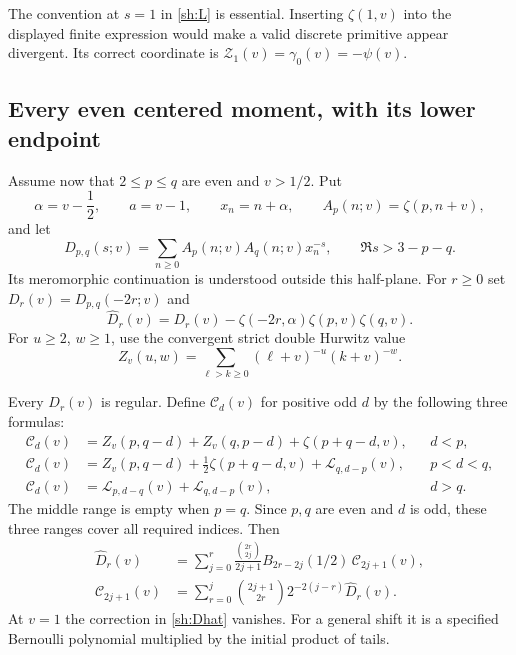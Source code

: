 The convention at $s=1$ in \eqref{sh:L} is essential.  Inserting
$\zeta(1,v)$ into the displayed finite expression would make a valid
discrete primitive appear divergent.  Its correct coordinate is
$\mathcal Z_1(v)=\gamma_0(v)=-\psi(v)$.

\subsection{Every even centered moment, with its lower endpoint}

Assume now that $2\le p\le q$ are even and $v>1/2$.  Put
\[
 \alpha=v-\frac12,\qquad a=v-1,\qquad x_n=n+\alpha,
 \qquad A_p(n;v)=\zeta(p,n+v),
\]
and let
\begin{equation}\label{sh:D}
 D_{p,q}(s;v)=\sum_{n\ge0}
           A_p(n;v)A_q(n;v)x_n^{-s},
 \qquad \Re s>3-p-q.
\end{equation}
Its meromorphic continuation is understood outside this half-plane.
For $r\ge0$ set $D_r(v)=D_{p,q}(-2r;v)$ and
\begin{equation}\label{sh:Dhat}
 \widehat D_r(v)=D_r(v)
       -\zeta(-2r,\alpha)\zeta(p,v)\zeta(q,v).
\end{equation}
For $u\ge2$, $w\ge1$, use the convergent strict double Hurwitz value
\[
 Z_v(u,w)=\sum_{\ell>k\ge0}
                  (\ell+v)^{-u}(k+v)^{-w}.
\]

\begin{theorem}\label{sh:transform}
Every $D_r(v)$ is regular.  Define $\mathcal C_d(v)$ for positive
odd $d$ by the following three formulas:
\begin{align}
 \mathcal C_d(v)
 &=Z_v(p,q-d)+Z_v(q,p-d)+\zeta(p+q-d,v),
 &&d<p,\label{sh:Clow}\\
 \mathcal C_d(v)
 &=Z_v(p,q-d)+\frac12\zeta(p+q-d,v)
                         +\mathcal L_{q,d-p}(v),
 &&p<d<q,\label{sh:Cmiddle}\\
 \mathcal C_d(v)
 &=\mathcal L_{p,d-q}(v)+\mathcal L_{q,d-p}(v),
 &&d>q.\label{sh:Cupper}
\end{align}
The middle range is empty when $p=q$.  Since $p,q$ are even and
$d$ is odd, these three ranges cover all required indices.  Then
\begin{align}
 \widehat D_r(v)
 &=\sum_{j=0}^r
    \frac{\binom{2r}{2j}}{2j+1}
       B_{2r-2j}(1/2)\,\mathcal C_{2j+1}(v),
       \label{sh:forward}\\
 \mathcal C_{2j+1}(v)
 &=\sum_{r=0}^j\binom{2j+1}{2r}
                         2^{-2(j-r)}\widehat D_r(v).
       \label{sh:inverse}
\end{align}
At $v=1$ the correction in \eqref{sh:Dhat} vanishes.  For a
general shift it is a specified Bernoulli polynomial multiplied by
the initial product of tails.
\end{theorem}

